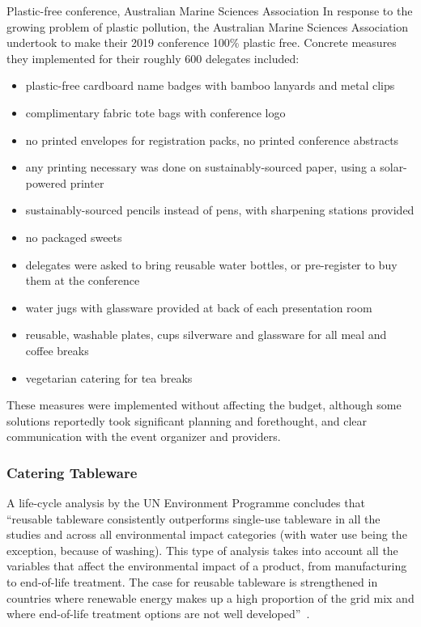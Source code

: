 \documentclass[../SustainableHEP.tex]{subfiles}
\begin{document}
\begin{bestpractice}{Plastic-free conference, Australian Marine Sciences Association}%
\noindent In response to the growing problem of plastic pollution, the Australian Marine Sciences Association undertook to make their 2019 conference 100\% plastic free. Concrete measures they implemented for their roughly 600 delegates included:
    \begin{itemize}
        \item plastic-free cardboard name badges with bamboo lanyards and metal clips
        \item complimentary fabric tote bags with conference logo
        \item no printed envelopes for registration packs, no printed conference abstracts
        \item any printing necessary was done on sustainably-sourced paper, using a solar-powered printer
        \item sustainably-sourced pencils instead of pens, with sharpening stations provided
        \item no packaged sweets
        \item delegates were asked to bring reusable water bottles, or pre-register to buy them at the conference
        \item water jugs with glassware provided at back of each presentation room
        \item reusable, washable plates, cups silverware and glassware for all meal and coffee breaks
        \item vegetarian catering for tea breaks
    \end{itemize}
    These measures were implemented without affecting the budget, although some solutions reportedly took significant planning and forethought, and clear communication with the event organizer and providers.
\end{bestpractice}

\subsubsection{Catering Tableware}
\label{sec:CateringTableware}
A life-cycle analysis by the UN Environment Programme concludes that “reusable tableware consistently outperforms single-use tableware in all the studies and across all environmental impact categories (with water use being the exception, because of washing). This type of analysis takes into account all the variables that affect the environmental impact of a product, from manufacturing to end-of-life treatment. The case for reusable tableware is strengthened in countries where renewable energy makes up a high proportion of the grid mix and where end-of-life treatment options are not well developed”~\cite{UNEP2021}. 
\end{document}
